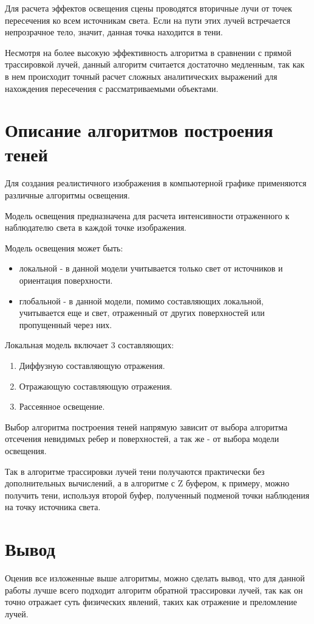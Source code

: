             Для расчета эффектов освещения сцены проводятся вторичные лучи от точек пересечения ко всем источникам света. Если на пути этих лучей встречается непрозрачное тело, значит, данная точка находится в тени.
            
            Несмотря на более высокую эффективность алгоритма в сравнении с прямой трассировкой лучей, данный алгоритм считается достаточно медленным, так как в нем происходит точный расчет сложных аналитических выражений для нахождения пересечения с рассматриваемыми объектами.
        
    \section{Описание алгоритмов построения теней}
        
        Для создания реалистичного изображения в компьютерной графике применяются различные алгоритмы освещения.
        
        Модель освещения предназначена для расчета интенсивности отраженного к наблюдателю света в каждой точке изображения.
        
        Модель освещения может быть:
        \begin{itemize}
            \item локальной - в данной модели учитывается только свет от источников и ориентация поверхности.
            \item глобальной - в данной модели, помимо составляющих локальной, учитывается еще и свет, отраженный от других поверхностей или пропущенный через них.
        \end{itemize}
        
        Локальная модель включает 3 составляющих:
        \begin{enumerate}
        	\item Диффузную составляющую отражения.
        	\item Отражающую составляющую отражения.
        	\item Рассеянное освещение.
        \end{enumerate}
        
        Выбор алгоритма построения теней напрямую зависит от выбора алгоритма отсечения невидимых ребер и поверхностей, а так же - от выбора модели освещения. 
        
        Так в алгоритме трассировки лучей тени получаются практически без дополнительных вычислений, а в алгоритме с Z буфером, к примеру, можно получить тени, используя второй буфер, полученный подменой точки наблюдения на точку источника света. 
        
    \section{Вывод}
        
        Оценив все изложенные выше алгоритмы, можно сделать вывод, что для данной работы лучше всего подходит алгоритм обратной трассировки лучей, так как он точно отражает суть физических явлений, таких как отражение и преломление лучей.
